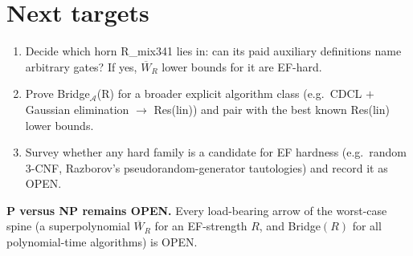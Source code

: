 \documentclass[11pt]{article}
\theoremstyle{definition}
\theoremstyle{remark}
\newcommand{\WR}[1]{\overline{W}_{#1}}
\begin{document}
\section{Next targets}
\begin{enumerate}
\item Decide which horn R\_mix341 lies in: can its paid auxiliary definitions name arbitrary gates? If yes, $\WR{R}$ lower bounds for it are EF-hard.
\item Prove Bridge$_{\mathcal A}$(R) for a broader explicit algorithm class (e.g.\ CDCL $+$ Gaussian elimination $\to$ Res(lin)) and pair with the best known Res(lin) lower bounds.
\item Survey whether any hard family is a candidate for EF hardness (e.g.\ random 3-CNF, Razborov's pseudorandom-generator tautologies) and record it as OPEN.
\end{enumerate}

\noindent\textbf{P versus NP remains OPEN.} Every load-bearing arrow of the worst-case spine (a superpolynomial $\WR{R}$ for an EF-strength $R$, and Bridge$(R)$ for all polynomial-time algorithms) is OPEN.
\end{document}

